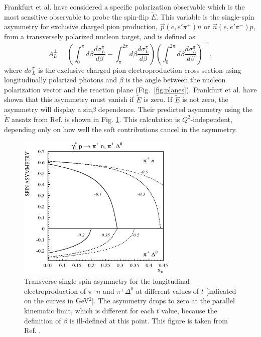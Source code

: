 \documentclass[preprint,superscriptaddress]{revtex4}
\begin{document}
Frankfurt et al. \cite{Fr99} have considered a specific polarization observable
which is the most sensitive observable to probe the spin-flip $\tilde{E}$.
This variable is the single-spin asymmetry for exclusive charged pion
production, $\vec{p}(e,e'\pi^+)n$ or $\vec{n}(e,e'\pi^-)p$, from a transversely
polarized nucleon target, and is defined \cite{Be01} as
\begin{equation} \label{eqn:asy}
A_L^{\perp}=(\int^{\pi}_0 d\beta \frac{d\sigma^{\pi}_L}{d\beta} -
\int^{2\pi}_{\pi} d\beta \frac{d\sigma^{\pi}_L}{d\beta})
(\int^{2\pi}_0 d\beta \frac{d\sigma^{\pi}_L}{d\beta})^{-1},
\end{equation}
where $d\sigma^{\pi}_L$ is the exclusive charged pion electroproduction cross
section using longitudinally polarized photons and $\beta$ is the angle between
the nucleon polarization vector and the reaction plane (Fig.~\ref{fig:planes}).  
Frankfurt et al. \cite{Fr99} have shown that this asymmetry must vanish if
$\tilde{E}$ is zero.  If $\tilde{E}$ is not zero, the asymmetry will display a
sin$\beta$ dependence.  Their predicted asymmetry using the $\tilde{E}$ ansatz
from Ref. \cite{Va99} is shown in Fig. \ref{fig:frankfurt_atpi}.  This
calculation is $Q^2$-independent, depending only on how well the soft
contributions cancel in the asymmetry.

\begin{figure}[hbt!]
\includegraphics[height=7cm]{frankfurt_atpi.ps}
\caption{\label{fig:frankfurt_atpi}
Transverse single-spin asymmetry for the longitudinal electroproduction of
$\pi^+n$ and $\pi^+\Delta^0$ at different values of $t$ [indicated on the
curves in GeV$^2$].  The asymmetry drops to zero at the parallel kinematic
limit, which is different for each $t$ value, because the definition of
$\beta$ is ill-defined at this point.  This figure is taken from
Ref. .
}
\end{figure}
\end{document}
